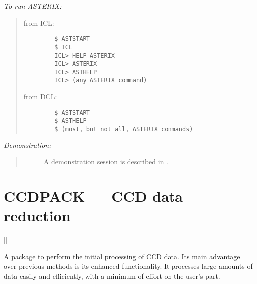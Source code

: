{\em To run ASTERIX:}\hfill
\begin{quote}
\begin{description}

\item [from ICL:]\hfill

\begin{small}
\begin{verbatim}
   $ ASTSTART
   $ ICL
   ICL> HELP ASTERIX
   ICL> ASTERIX
   ICL> ASTHELP
   ICL> (any ASTERIX command)
\end{verbatim}
\end{small}


\item [from DCL:]\hfill

\begin{small}
\begin{verbatim}
   $ ASTSTART
   $ ASTHELP
   $ (most, but not all, ASTERIX commands)
\end{verbatim}
\end{small}

\end{description}
\end{quote}

{\em Demonstration:}\hfill
\begin{quote}
\begin{description}
\item [] A demonstration session is described in
.
\end{description}
\end{quote}

\newpage

\section{CCDPACK --- CCD data reduction}

\vspace{-11mm}

\hfill []

\vspace{5mm}

A package to perform the initial processing of CCD data.
Its main advantage over previous methods is its enhanced functionality.
It processes large amounts of data easily and efficiently, with a minimum of
effort on the user's part.

